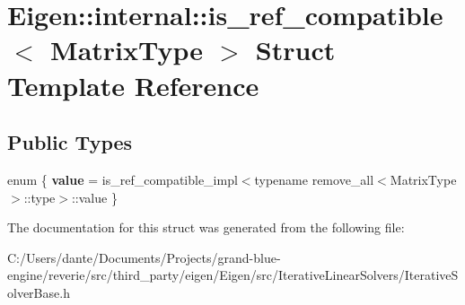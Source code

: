 \hypertarget{struct_eigen_1_1internal_1_1is__ref__compatible}{}\section{Eigen\+::internal\+::is\+\_\+ref\+\_\+compatible$<$ Matrix\+Type $>$ Struct Template Reference}
\label{struct_eigen_1_1internal_1_1is__ref__compatible}
\subsection*{Public Types}
\begin{DoxyCompactItemize}
\item 
\mbox{\label{struct_eigen_1_1internal_1_1is__ref__compatible_ac95a3482a716690d00b1e25aaa4a9348}} 
enum \{ {\bfseries value} = is\+\_\+ref\+\_\+compatible\+\_\+impl$<$typename remove\+\_\+all$<$Matrix\+Type$>$\+::type$>$\+::value
 \}
\end{DoxyCompactItemize}


The documentation for this struct was generated from the following file\+:\begin{DoxyCompactItemize}
\item 
C\+:/\+Users/dante/\+Documents/\+Projects/grand-\/blue-\/engine/reverie/src/third\+\_\+party/eigen/\+Eigen/src/\+Iterative\+Linear\+Solvers/Iterative\+Solver\+Base.\+h\end{DoxyCompactItemize}
